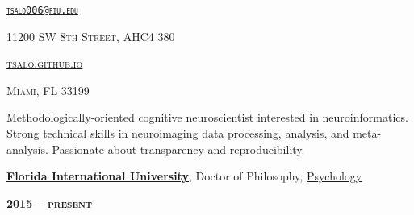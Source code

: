 \documentclass[10pt]{article}
\date{}
\newcommand{\namestyle}{\Huge \fontfamily{lmr}\selectfont}
\newcommand{\iconstyle}{\LARGE}
\newcommand{\headstyle}{\scshape \normalsize \textcolor{light-gray}}
\newcommand{\sectionstyle}{\LARGE \fontfamily{lmr}\selectfont}
\begin{document}
\begin{center}
	\namestyle{TAYLOR SALO}

	\bigskip

	\iconstyle{\href{https://github.com/tsalo}{\faGithubSquare}}
	\enspace
	\iconstyle{\href{https://www.researchgate.net/profile/Taylor_Salo}{}}
	\enspace
	\iconstyle{\href{https://scholar.google.com/citations?user=YbH1akIAAAAJ}{}}
	\enspace
	\iconstyle{\href{https://osf.io/iwpvm/}{}}
\end{center}

\begin{minipage}[t]{.5\linewidth}
\flushleft
\headstyle{\href{mailto:tsalo006@fiu.edu}{\nolinkurl{tsalo006@fiu.edu}}}
\end{minipage}
\hfill
\begin{minipage}[t]{.5\linewidth}
\flushright
\headstyle{11200 SW 8th Street, AHC4 380}
\end{minipage}

\begin{minipage}[t]{.3\linewidth}
\flushleft
\headstyle{\href{https://tsalo.github.io}{tsalo.github.io}}
\end{minipage}
\hfill
\begin{minipage}[t]{.7\linewidth}
\flushright
\headstyle{Miami, FL 33199}
\end{minipage}

\bigskip

\begin{center}\sectionstyle{PROFILE}\end{center}

Methodologically-oriented cognitive neuroscientist interested in
neuroinformatics. Strong technical skills in neuroimaging data
processing, analysis, and meta-analysis. Passionate about transparency
and reproducibility.

\bigskip

\begin{center}\sectionstyle{EDUCATION}\end{center}

\begin{minipage}[t]{.7\linewidth}
\flushleft
\noindent
\href{https://fiu.edu}{\textbf{Florida International University}},
Doctor of Philosophy,
\href{https://psychology.fiu.edu}{Psychology}
\end{minipage}
\hfill
\begin{minipage}[t]{.3\linewidth}
\flushright
\noindent
\textsc{\textbf{2015 -- present}}
\end{minipage}
\end{document}
